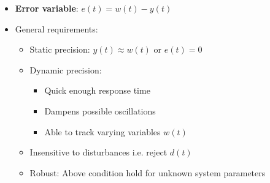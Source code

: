 \documentclass[conference]{IEEEtran}
\begin{document}
\begin{itemize}
    \item \textbf{Error variable}: $e(t) = w(t) - y(t)$
    \item General requirements:
    \begin{itemize}
        \item Static precision: $y(t) \approx w(t)$ or $e(t) = 0$
        \item Dynamic precision: 
        \begin{itemize}
            \item Quick enough response time 
            \item Dampens possible oscillations 
            \item Able to track varying variables $w(t)$
        \end{itemize}
        \item Insensitive to disturbances i.e. reject $d(t)$
        \item Robust: Above condition hold for unknown system parameters
    \end{itemize}
\end{itemize}



\end{document}
